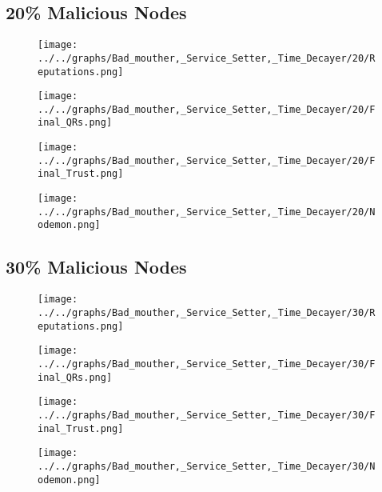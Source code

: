 \begin{minipage}[t]{0.49\columnwidth}
\subsection*{20\% Malicious Nodes}
    \begin{figure}[H]
        \centering
        \texttt{[image: ../../graphs/Bad\_mouther,\_Service\_Setter,\_Time\_Decayer/20/Reputations.png]}
    \end{figure}
    \begin{figure}[H]
        \centering
        \texttt{[image: ../../graphs/Bad\_mouther,\_Service\_Setter,\_Time\_Decayer/20/Final\_QRs.png]}
    \end{figure}
\end{minipage}
\begin{minipage}[t]{0.49\columnwidth}
    \begin{figure}[H]
        \centering
        \texttt{[image: ../../graphs/Bad\_mouther,\_Service\_Setter,\_Time\_Decayer/20/Final\_Trust.png]}
    \end{figure}
    \begin{figure}[H]
        \centering
        \texttt{[image: ../../graphs/Bad\_mouther,\_Service\_Setter,\_Time\_Decayer/20/Nodemon.png]}
    \end{figure}
\end{minipage}

\begin{minipage}[t]{0.49\columnwidth}
\subsection*{30\% Malicious Nodes}
    \begin{figure}[H]
        \centering
        \texttt{[image: ../../graphs/Bad\_mouther,\_Service\_Setter,\_Time\_Decayer/30/Reputations.png]}
    \end{figure}
    \begin{figure}[H]
        \centering
        \texttt{[image: ../../graphs/Bad\_mouther,\_Service\_Setter,\_Time\_Decayer/30/Final\_QRs.png]}
    \end{figure}
\end{minipage}
\begin{minipage}[t]{0.49\columnwidth}
    \begin{figure}[H]
        \centering
        \texttt{[image: ../../graphs/Bad\_mouther,\_Service\_Setter,\_Time\_Decayer/30/Final\_Trust.png]}
    \end{figure}
    \begin{figure}[H]
        \centering
        \texttt{[image: ../../graphs/Bad\_mouther,\_Service\_Setter,\_Time\_Decayer/30/Nodemon.png]}
    \end{figure}
\end{minipage}

